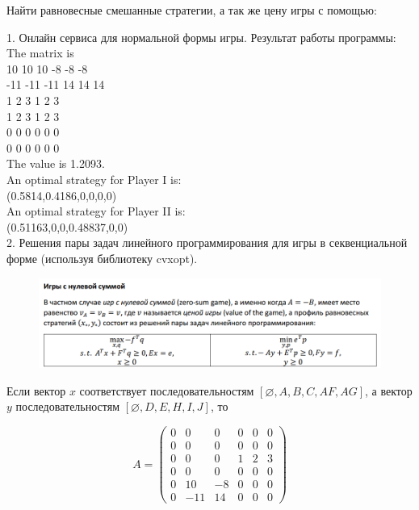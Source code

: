 \documentclass{article}
\begin{document}
    Найти равновесные смешанные стратегии, а так же цену игры с помощью:
    
    1. Онлайн сервиса для нормальной формы игры.
     \bigbreak
    Результат работы программы:\\
    The matrix is\\
    10 10 10 -8 -8 -8\\
    -11 -11 -11 14 14 14\\
    1 2 3 1 2 3\\
    1 2 3 1 2 3\\
    0 0 0 0 0 0\\
    0 0 0 0 0 0\\
    The value is 1.2093.\\
    An optimal strategy for Player I is:\\
    (0.5814,0.4186,0,0,0,0)\\
    An optimal strategy for Player II is:\\
    (0.51163,0,0,0.48837,0,0)\\
    
    2. Решения пары задач линейного программирования для игры в секвенциальной форме (используя библиотеку cvxopt).
    
    \begin{figure}[ht]

        \includegraphics[width=1\linewidth]{imgs/task3_theory.png}

    \end{figure} 
    
    Если вектор $x$ соответствует последовательностям $[\varnothing, A, B, C, AF, AG]$, а вектор $y$ последовательностям $[\varnothing, D, E, H, I, J]$, то 
    
    \begin{equation*}
        A = \left(
        \begin{matrix}
            0 & 0 & 0 & 0 & 0 & 0\\
            0 & 0 & 0 & 0 & 0 & 0\\
            0 & 0 & 0 & 1 & 2 & 3 \\
            0 & 0 & 0 & 0 & 0 & 0 \\
            0 & 10 & -8 & 0 & 0 & 0 \\
            0 & -11 & 14 & 0 & 0 & 0
        \end{matrix}
        \right)
    \end{equation*}
    
\end{document}
